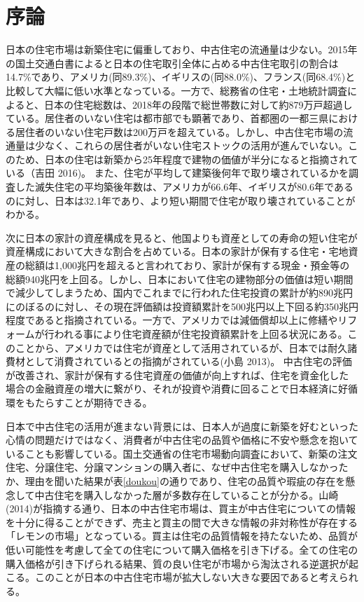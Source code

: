 \documentclass[a4paper,fontsize=11pt,report,notitlepage,line_length=38zw,number_of_lines=40,dvipdfmx]{jlreq}
\begin{document}
\newpage
\tableofcontents

\newpage
\chapter{序論}
日本の住宅市場は新築住宅に偏重しており、中古住宅の流通量は少ない。2015年の国土交通白書によると日本の住宅取引全体に占める中古住宅取引の割合は14.7\%であり、アメリカ(同89.3\%)、イギリスの(同88.0\%)、フランス(同68.4\%)と比較して大幅に低い水準となっている\cite{hakusho}。一方で、総務省の住宅・土地統計調査によると、日本の住宅総数は、2018年の段階で総世帯数に対して約879万戸超過している。居住者のいない住宅は都市部でも顕著であり、首都圏の一都三県における居住者のいない住宅戸数は200万戸を超えている。しかし、中古住宅市場の流通量は少なく、これらの居住者がいない住宅ストックの活用が進んでいない。このため、日本の住宅は新築から25年程度で建物の価値が半分になると指摘されている（吉田 2016)\cite{yoshida2016}。
また、住宅が平均して建築後何年で取り壊されているかを調査した滅失住宅の平均築後年数は、アメリカが66.6年、イギリスが80.6年であるのに対し、日本は32.1年であり、より短い期間で住宅が取り壊されていることがわかる\cite{kizonjutaku}。

次に日本の家計の資産構成を見ると、他国よりも資産としての寿命の短い住宅が資産構成において大きな割合を占めている。日本の家計が保有する住宅・宅地資産の総額は1,000兆円を超えると言われており、家計が保有する現金・預金等の総額940兆円を上回る。しかし、日本において住宅の建物部分の価値は短い期間で減少してしまうため、国内でこれまでに行われた住宅投資の累計が約890兆円にのぼるのに対し、その現在評価額は投資額累計を500兆円以上下回る約350兆円程度であると指摘されている\cite{roundtable}。一方で、アメリカでは減価償却以上に修繕やリフォームが行われる事により住宅資産額が住宅投資額累計を上回る状況にある。このことから、アメリカでは住宅が資産として活用されているが、日本では耐久諸費材として消費されているとの指摘がされている(小島 2013)\cite{kojima2013}。
中古住宅の評価が改善され、家計が保有する住宅資産の価値が向上すれば、住宅を資金化した場合の金融資産の増大に繋がり、それが投資や消費に回ることで日本経済に好循環をもたらすことが期待できる。

日本で中古住宅の活用が進まない背景には、日本人が過度に新築を好むといった心情の問題だけではなく、消費者が中古住宅の品質や価格に不安や懸念を抱いていることも影響している。国土交通省の住宅市場動向調査において、新築の注文住宅、分譲住宅、分譲マンションの購入者に、なぜ中古住宅を購入しなかったか、理由を聞いた結果が表\ref{doukou}の通りであり、住宅の品質や瑕疵の存在を懸念して中古住宅を購入しなかった層が多数存在していることが分かる。山崎(2014)\cite{yamasaki2014}が指摘する通り、日本の中古住宅市場は、買主が中古住宅についての情報を十分に得ることができず、売主と買主の間で大きな情報の非対称性が存在する「レモンの市場」となっている。買主は住宅の品質情報を持たないため、品質が低い可能性を考慮して全ての住宅について購入価格を引き下げる。全ての住宅の購入価格が引き下げられる結果、質の良い住宅が市場から淘汰される逆選択が起こる。このことが日本の中古住宅市場が拡大しない大きな要因であると考えられる。
\end{document}
